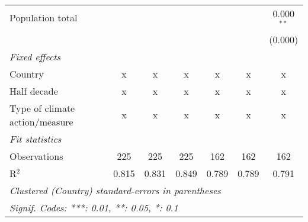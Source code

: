 \begin{tabular}{lcccccc}
   Population total                                                     &         &                &                &                &                & 0.000$^{**}$\\   
                                                                        &         &                &                &                &                & (0.000)\\   
   \emph{Fixed effects}\\
   Country                                                              & x       & x              & x              & x              & x              & x\\  
   Half decade                                                          & x       & x              & x              & x              & x              & x\\  
   Type of climate action/measure                                       & x       & x              & x              & x              & x              & x\\  
   \midrule \emph{Fit statistics}\\
   Observations                                                         & 225     & 225            & 225            & 162            & 162            & 162\\  
   R$^2$                                                                & 0.815   & 0.831          & 0.849          & 0.789          & 0.789          & 0.791\\  
   \midrule
   \multicolumn{7}{l}{\emph{Clustered (Country) standard-errors in parentheses}}\\
   \multicolumn{7}{l}{\emph{Signif. Codes: ***: 0.01, **: 0.05, *: 0.1}}\\
\end{tabular}
\par\endgroup


